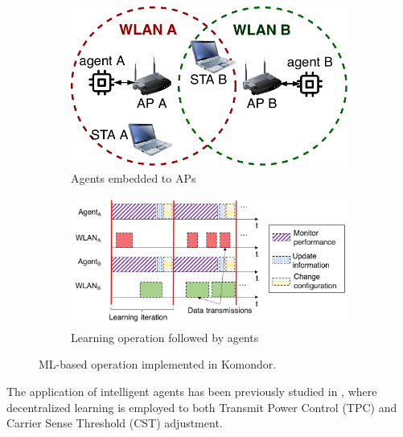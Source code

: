 \documentclass{article}
\begin{document}
	\begin{figure}[t!]
		\centering
		\begin{subfigure}[b]{0.4\columnwidth}			\includegraphics[width=\textwidth]{wlan_agents.pdf}
			\caption{Agents embedded to APs}
			\label{fig:wlan_agents}
		\end{subfigure}%
		\begin{subfigure}[b]{.6\columnwidth}
		\includegraphics[width=\textwidth]{agents_operation.png}
			\caption{Learning operation followed by agents}
			\label{fig:agents_operation}
		\end{subfigure}
		\caption{ML-based operation implemented in Komondor.}
		\label{fig:agents_komondor}
	\end{figure}
	
	The application of intelligent agents has been previously studied in \cite{wilhelmi2019collaborative, wilhelmi2019potential}, where decentralized learning is employed to both Transmit Power Control (TPC) and Carrier Sense Threshold (CST) adjustment.
	
\end{document}
